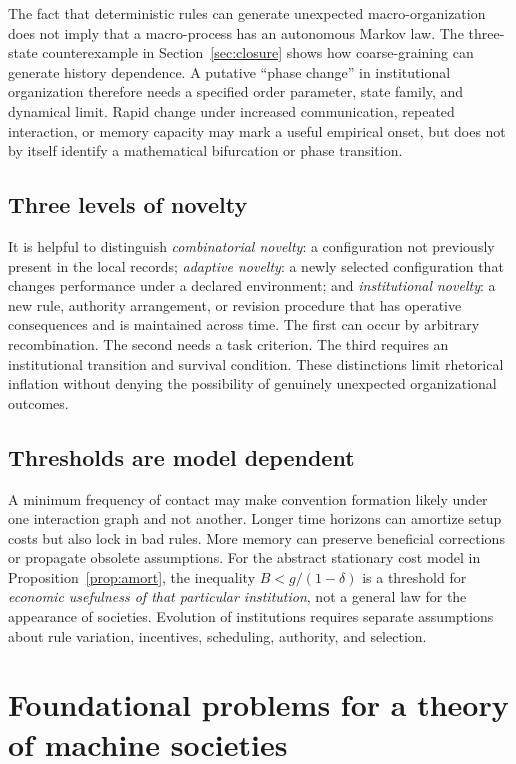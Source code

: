 \documentclass[11pt,letterpaper]{article}
\theoremstyle{plain}
\theoremstyle{definition}
\theoremstyle{remark}
\begin{document}
The fact that deterministic rules can generate unexpected macro-organization does not imply that a macro-process has an autonomous Markov law. The three-state counterexample in Section~\ref{sec:closure} shows how coarse-graining can generate history dependence. A putative ``phase change'' in institutional organization therefore needs a specified order parameter, state family, and dynamical limit. Rapid change under increased communication, repeated interaction, or memory capacity may mark a useful empirical onset, but does not by itself identify a mathematical bifurcation or phase transition.

\subsection{Three levels of novelty}

It is helpful to distinguish \emph{combinatorial novelty}: a configuration not previously present in the local records; \emph{adaptive novelty}: a newly selected configuration that changes performance under a declared environment; and \emph{institutional novelty}: a new rule, authority arrangement, or revision procedure that has operative consequences and is maintained across time. The first can occur by arbitrary recombination. The second needs a task criterion. The third requires an institutional transition and survival condition. These distinctions limit rhetorical inflation without denying the possibility of genuinely unexpected organizational outcomes.

\subsection{Thresholds are model dependent}

A minimum frequency of contact may make convention formation likely under one interaction graph and not another. Longer time horizons can amortize setup costs but also lock in bad rules. More memory can preserve beneficial corrections or propagate obsolete assumptions. For the abstract stationary cost model in Proposition~\ref{prop:amort}, the inequality $B<g/(1-\delta)$ is a threshold for \emph{economic usefulness of that particular institution}, not a general law for the appearance of societies. Evolution of institutions requires separate assumptions about rule variation, incentives, scheduling, authority, and selection.

\section{Foundational problems for a theory of machine societies}\label{sec:problems}
\end{document}
